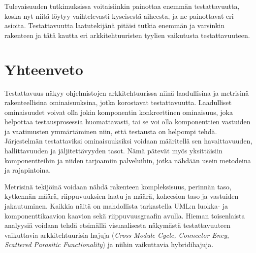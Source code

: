 \documentclass[finnish]{tktltiki2}
\numberwithin{table}{section}
\theoremstyle{definition}
\theoremstyle{remark}
\begin{document}
Tulevaisuuden tutkimuksissa voitaisiinkin painottaa enemmän testattavuutta, koska nyt niitä löytyy vaihtelevasti kyseisestä aiheesta, ja ne painottavat eri asioita. Testattavuutta laatutekijänä pitäisi tutkia enemmän ja varsinkin rakenteen ja tätä kautta eri arkkitehtuuristen tyylien vaikutusta testattavuuteen. 




\section{Yhteenveto}


Testattavuus näkyy ohjelmistojen arkkitehtuurissa niinä laadullisina ja metrisinä rakenteellisina ominaisuuksina, jotka korostavat testattavuutta. Laadulliset ominaisuudet voivat olla jokin komponentin konkreettinen ominaisuus, joka helpottaa testausprosessia huomattavasti, tai se voi olla komponenttien vastuiden ja vaatimusten ymmärtäminen niin, että testausta on helpompi tehdä. Järjestelmän testattaviksi ominaisuuksiksi voidaan määritellä sen havaittavuuden, hallittavuuden ja jäljitettävyyden tasot. Nämä pätevät myös yksittäisiin komponentteihin ja niiden tarjoamiin palveluihin, jotka nähdään usein metodeina ja rajapintoina.

Metrisinä tekijöinä voidaan nähdä rakenteen kompleksisuus, perinnän taso, kytkennän määrä, riippuvuuksien laatu ja määrä, koheesion taso ja vastuiden jakautuminen. Kaikkia näitä on mahdollista tarkastella UML:n luokka- ja komponenttikaavion kaavion sekä riippuvuusgraafin avulla. Hieman toisenlaista analyysiä voidaan tehdä etsimällä visuaalisesta näkymästä testattavuuteen vaikuttavia arkkitehtuurisia hajuja (\textit{Cross-Module Cycle, Connector Ency, Scattered Parasitic Functionality}) ja niihin vaikuttavia hybridihajuja. 


\end{document}
